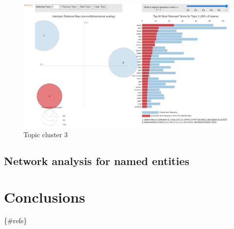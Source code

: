 \documentclass[
  12pt,
]{article}
\begin{document}
\begin{figure}[H]

{\centering \includegraphics{NHthesis_0728_files/figure-pdf/fig-topic_cluster3-output-1.png}

}

\caption{\label{fig-topic_cluster3}Topic cluster 3}

\end{figure}

\hypertarget{network-analysis-for-named-entities}{%
\subsection{Network analysis for named
entities}\label{network-analysis-for-named-entities}}

\hypertarget{conclusions}{%
\section{Conclusions}\label{conclusions}}

\{\#refs\}
\end{document}
